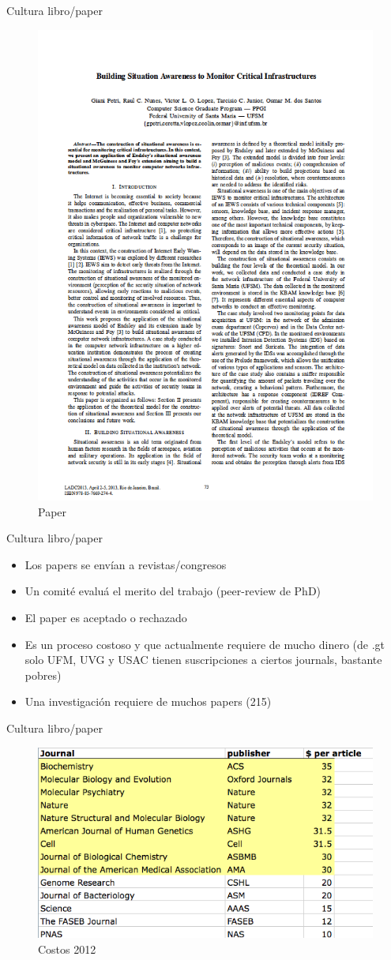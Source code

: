 \documentclass{beamer}
\begin{document}
\begin{frame}{Cultura libro/paper}
\begin{figure}[tbph]
\centering
\includegraphics[width=0.7\linewidth]{Figures/Selection_001}
\caption{Paper}
\end{figure}
\end{frame}


\begin{frame}{Cultura libro/paper}
\begin{itemize}
\item Los papers se envían a revistas/congresos
\item Un comité evaluá el merito del trabajo (peer-review de PhD)
\item El paper es aceptado o rechazado
\item Es un proceso costoso y que actualmente requiere de mucho dinero (de .gt solo UFM, UVG y USAC tienen suscripciones a ciertos journals, bastante pobres)
\item Una investigación requiere de muchos papers (215)
\end{itemize}
\end{frame}

\begin{frame}{Cultura libro/paper}
\begin{figure}[tbph]
\centering
\includegraphics[width=0.65\linewidth]{./Figures/costo.png}
\caption{Costos 2012}
\label{fig:costos}
\end{figure}
\end{frame}
\end{document}
